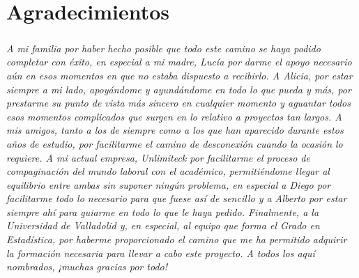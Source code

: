 \documentclass{subfiles}
\begin{document}
  \chapter*{Agradecimientos}
  \label{sec:acknowledgements}

    \paragraph{}
    \emph{A mi familia por haber hecho posible que todo este camino se haya podido completar con éxito, en especial a mi madre, Lucía por darme el apoyo necesario aún en esos momentos en que no estaba dispuesto a recibirlo. A Alicia, por estar siempre a mi lado, apoyándome y ayundándome en todo lo que pueda y más, por prestarme su punto de vista más sincero en cualquier momento y aguantar todos esos momentos complicados que surgen en lo relativo a proyectos tan largos. A mis amigos, tanto a los de siempre como a los que han aparecido durante estos años de estudio, por facilitarme el camino de desconexión cuando la ocasión lo requiere. A mi actual empresa, Unlimiteck por facilitarme el proceso de compaginación del mundo laboral con el académico, permitiéndome llegar al equilibrio entre ambas sin suponer ningún problema, en especial a Diego por facilitarme todo lo necesario para que fuese así de sencillo y a Alberto por estar siempre ahí para guiarme en todo lo que le haya pedido. Finalmente, a la Universidad de Valladolid y, en especial, al equipo que forma el Grado en Estadística, por haberme proporcionado el camino que me ha permitido adquirir la formación necesaria para llevar a cabo este proyecto. A todos los aquí nombrados, ¡muchas gracias por todo!}
\end{document}
